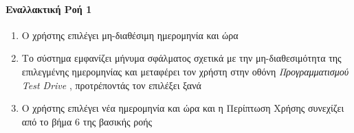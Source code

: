 \documentclass{../ol-softwaremanual}
\begin{document}
	\paragraph{Εναλλακτική Ροή 1}
	
	\begin{enumerate}
		\item Ο χρήστης επιλέγει μη-διαθέσιμη ημερομηνία και ώρα
		\item Το σύστημα εμφανίζει μήνυμα σφάλματος σχετικά με την μη-διαθεσιμότητα της επιλεγμένης ημερομηνίας και μεταφέρει τον χρήστη στην οθόνη \textit{Προγραμματισμού \en Test Drive \gr}, προτρέποντάς τον επιλέξει ξανά
		\item Ο χρήστης επιλέγει νέα ημερομηνία και ώρα και η Περίπτωση Χρήσης συνεχίζει από το βήμα 6 της βασικής ροής
	\end{enumerate}


	\paragraph{}
	
	
	
	\paragraph{}
	
\end{document}
